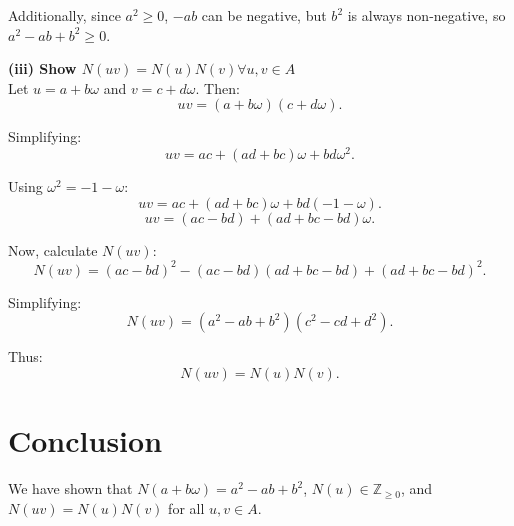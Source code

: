\documentclass[12pt]{amsart}
\theoremstyle{definition}
\numberwithin{equation}{section}
\newcommand{\Z}{\mathbb{Z}}
\begin{document}
\begin{exercise}{9}
    Additionally, since \(a^2 \geq 0\), \(-ab\) can be negative, but \(b^2\) is always non-negative, so \(a^2 - ab + b^2 \geq 0\).

    \noindent \textbf{(iii) Show \(N(uv) = N(u)N(v) \forall u, v \in A\)}\\
    Let \(u = a + b \omega \) and \(v = c + d \omega \). Then:
    \[
    uv = (a + b \omega)(c + d \omega).
    \]

    Simplifying:
    \[
    uv = ac + (ad + bc) \omega + bd \omega^2.
    \]

    Using \(\omega^2 = -1 - \omega \):
    \[
    uv = ac + (ad + bc) \omega + bd (-1 - \omega).
    \]
    \[
    uv = (ac - bd) + (ad + bc - bd) \omega.
    \]

    Now, calculate \(N(uv)\):
    \[
    N(uv) = {(ac - bd)}^2 - (ac - bd)(ad + bc - bd) + {(ad + bc - bd)}^2.
    \]

    Simplifying:
    \[
    N(uv) = (a^2 - ab + b^2)(c^2 - cd + d^2).
    \]

    Thus:
    \[
    N(uv) = N(u)N(v).
    \]

    \section*{Conclusion}
    We have shown that \(N(a + b \omega) = a^2 - ab + b^2\), \(N(u) \in \Z_{\geq 0}\), and \(N(uv) = N(u)N(v)\) for all \(u, v \in A\).

\end{exercise}
\newpage
\end{document}
